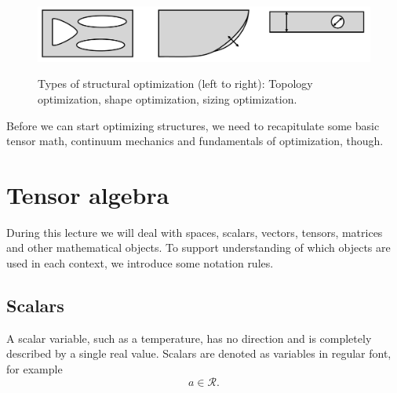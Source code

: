 \begin{figure}[!htpb]
    \centering
    \includegraphics[width=\textwidth, alt={Sketch topology optimization, shape optimization, sizing optimization}]{figures/structural_optimization_types.png}
    \caption{Types of structural optimization (left to right): Topology optimization, shape optimization, sizing optimization.}
    \label{fig:structural_optimization_types.}
\end{figure}

Before we can start optimizing structures, we need to recapitulate some basic tensor math, continuum mechanics and fundamentals of optimization, though. 

\section{Tensor algebra}
During this lecture we will deal with spaces, scalars, vectors, tensors, matrices and other mathematical objects. To support understanding of which objects are used in each context, we introduce some notation rules. 

\subsection{Scalars}
A scalar variable, such as a temperature, has no direction and is completely described by a single real value. Scalars are denoted as variables in regular font, for example
\begin{equation}
    a \in \mathcal{R}.
\end{equation}

